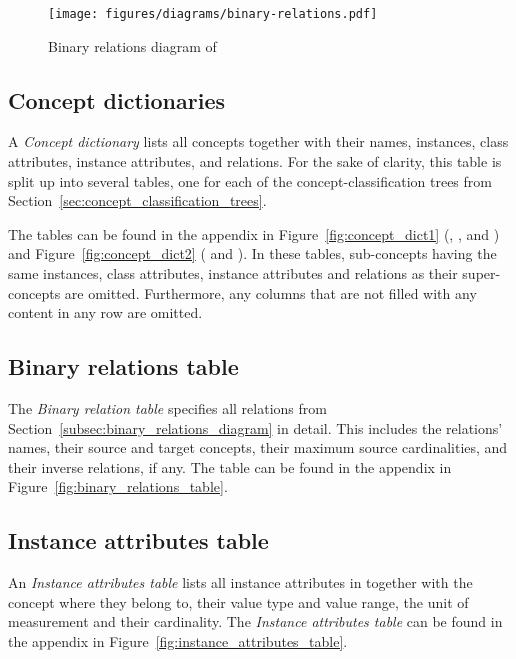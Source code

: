 \begin{figure}
  \centering
  \texttt{[image: figures/diagrams/binary-relations.pdf]}
  \caption{Binary relations diagram of \smarthomeweather}
  \label{fig:binary_relations}
\end{figure}

\subsection{Concept dictionaries}
\label{subsec:concept_dictionaries}

A \emph{Concept dictionary} lists all concepts together with their names, instances, class attributes, instance attributes, and relations. For the sake of clarity, this table is split up into several tables, one for each of the concept-classification trees from Section~\ref{sec:concept_classification_trees}.

The tables can be found in the appendix in Figure~\ref{fig:concept_dict1} (, , and ) and Figure~\ref{fig:concept_dict2} ( and ). In these tables, sub-concepts having the same instances, class attributes, instance attributes and relations as their super-concepts are omitted. Furthermore, any columns that are not filled with any content in any row are omitted.

\subsection{Binary relations table}
\label{subsec:binary_relations_table}

The \emph{Binary relation table} specifies all relations from Section~\ref{subsec:binary_relations_diagram} in detail. This includes the relations' names, their source and target concepts, their maximum source cardinalities, and their inverse relations, if any. The table can be found in the appendix in Figure~\ref{fig:binary_relations_table}.

\subsection{Instance attributes table}
\label{subsec:instance_attributes_table}

An \emph{Instance attributes table} lists all instance attributes in \smarthomeweather together with the concept where they belong to, their value type and value range, the unit of measurement and their cardinality. The \emph{Instance attributes table} can be found in the appendix in Figure~\ref{fig:instance_attributes_table}.

